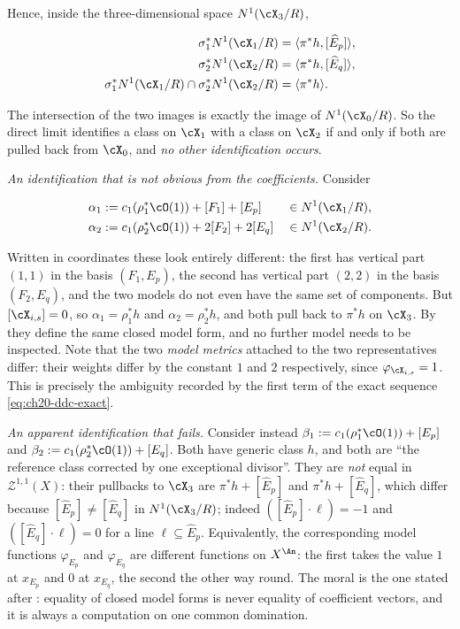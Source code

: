 \begin{example}
Hence, inside the three-dimensional space $N^1(\cX_3/R)$,

\begin{equation}
\label{eq:ch20-two-model-images}
 \begin{aligned}
 \sigma_1^*N^1(\cX_1/R)
   &=\langle\pi^*h,[\widehat E_p]\rangle,\\
 \sigma_2^*N^1(\cX_2/R)
   &=\langle\pi^*h,[\widehat E_q]\rangle,\\
 \sigma_1^*N^1(\cX_1/R)\cap\sigma_2^*N^1(\cX_2/R)
   &=\langle\pi^*h\rangle .
 \end{aligned}
\end{equation}

The intersection of the two images is exactly the image of
$N^1(\cX_0/R)$.  So the direct limit identifies a class on $\cX_1$ with
a class on $\cX_2$ if and only if both are pulled back from $\cX_0$,
and \emph{no other identification occurs}.

\emph{An identification that is not obvious from the coefficients.}
Consider

\[
\begin{aligned}
 \alpha_1&:=c_1(\rho_1^*\cO(1))+[F_1]+[E_p]&&\in N^1(\cX_1/R),\\
 \alpha_2&:=c_1(\rho_2^*\cO(1))+2[F_2]+2[E_q]&&\in N^1(\cX_2/R).
\end{aligned}
\]

Written in coordinates these look entirely different: the first has vertical
part $(1,1)$ in the basis $(F_1,E_p)$, the second has vertical part
$(2,2)$ in the basis $(F_2,E_q)$, and the two models do not even have
the same set of components.  But $[\cX_{i,s}]=0$, so
$\alpha_1=\rho_1^*h$ and $\alpha_2=\rho_2^*h$, and both pull back to
$\pi^*h$ on $\cX_3$.  By
 they define the same closed model
form, and no further model needs to be inspected.  Note that the two
\emph{model metrics} attached to the two representatives differ: their
weights differ by the constant $1$ and $2$ respectively, since
$\varphi_{\cX_{i,s}}=1$.  This is precisely the ambiguity recorded by the
first term of the exact sequence \eqref{eq:ch20-ddc-exact}.

\emph{An apparent identification that fails.}  Consider instead
$\beta_1:=c_1(\rho_1^*\cO(1))+[E_p]$ and
$\beta_2:=c_1(\rho_2^*\cO(1))+[E_q]$.  Both have generic class $h$, and
both are ``the reference class corrected by one exceptional divisor''.  They
are \emph{not} equal in $\mathcal Z^{1,1}(X)$: their pullbacks to
$\cX_3$ are $\pi^*h+[\widehat E_p]$ and $\pi^*h+[\widehat E_q]$,
which differ because $[\widehat E_p]\neq[\widehat E_q]$ in
$N^1(\cX_3/R)$; indeed $([\widehat E_p]\cdot\ell)=-1$ and
$([\widehat E_q]\cdot\ell)=0$ for a line $\ell\subseteq\widehat E_p$.
Equivalently, the corresponding model functions
$\varphi_{E_p}$ and $\varphi_{E_q}$ are different functions on
$X^{\An}$: the first takes the value $1$ at $x_{E_p}$ and $0$ at
$x_{E_q}$, the second the other way round.  The moral is the one stated
after : equality of closed model forms is
never equality of coefficient vectors, and it is always a computation on one
common domination.
\end{example}

